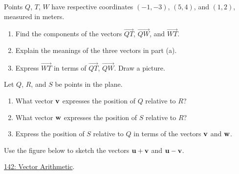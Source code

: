 \documentclass{ximera}
\begin{document}
\begin{question} \label{QDFEUJZXFedd}
Points $Q$, $T$, $W$ have respective coordinates $(-1,-3)$, $(5,4)$, and $(1,2)$, measured in meters.

\begin{enumerate}
\item Find the components of the vectors $\overrightarrow{QT}$, $\overrightarrow{QW}$, and $\overrightarrow{WT}$.

\item Explain the meanings of the three vectors in part (a).

\item Express $\overrightarrow{WT}$ in terms of $\overrightarrow{QT}$, $\overrightarrow{QW}$. Draw a picture.
\end{enumerate}

\end{question}


\begin{question}  \label{QodfderrewEWR}
Let $Q$, $R$, and $S$ be points in the plane.

\begin{enumerate}
\item What vector ${\bf v}$ expresses the position of $Q$ relative to $R$?

\item What vector ${\bf w}$ expresses the position of $S$ relative to $R$?

\item Express the position of $S$ relative to $Q$ in terms of the vectors ${\bf v}$ and ${\bf w}$.
\end{enumerate}
\end{question}

\begin{question}  \label{Q343g0dce}
Use the figure below to sketch the vectors ${\bf u}+{\bf v}$ and ${\bf u} - {\bf v}$.

\href{https://www.geogebra.org/classic/xunxnnyh}{142: Vector Arithmetic}.

 
\begin{onlineOnly}
    \begin{center}
\end{center}
\end{onlineOnly}

\end{question}
\end{document}
